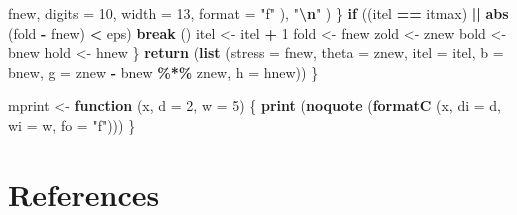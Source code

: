 \documentclass[
  12pt,
]{article}
\newenvironment{Shaded}{\begin{snugshade}}{\end{snugshade}}
\newcommand{\AttributeTok}[1]{\textcolor[rgb]{0.13,0.29,0.53}{#1}}
\newcommand{\ControlFlowTok}[1]{\textcolor[rgb]{0.13,0.29,0.53}{\textbf{#1}}}
\newcommand{\DecValTok}[1]{\textcolor[rgb]{0.00,0.00,0.81}{#1}}
\newcommand{\FunctionTok}[1]{\textcolor[rgb]{0.13,0.29,0.53}{\textbf{#1}}}
\newcommand{\NormalTok}[1]{#1}
\newcommand{\OtherTok}[1]{\textcolor[rgb]{0.56,0.35,0.01}{#1}}
\newcommand{\SpecialCharTok}[1]{\textcolor[rgb]{0.81,0.36,0.00}{\textbf{#1}}}
\newcommand{\StringTok}[1]{\textcolor[rgb]{0.31,0.60,0.02}{#1}}
\begin{document}
\begin{Shaded}
\begin{Highlighting}[]
\NormalTok{          fnew,}
          \AttributeTok{digits =} \DecValTok{10}\NormalTok{,}
          \AttributeTok{width =} \DecValTok{13}\NormalTok{,}
          \AttributeTok{format =} \StringTok{"f"}
\NormalTok{        ),}
        \StringTok{"}\SpecialCharTok{\textbackslash{}n}\StringTok{"}
\NormalTok{      )}
\NormalTok{    \}}
    \ControlFlowTok{if}\NormalTok{ ((itel }\SpecialCharTok{==}\NormalTok{ itmax) }\SpecialCharTok{||} \FunctionTok{abs}\NormalTok{ (fold }\SpecialCharTok{{-}}\NormalTok{ fnew) }\SpecialCharTok{\textless{}}\NormalTok{ eps)}
      \ControlFlowTok{break}\NormalTok{ ()}
\NormalTok{    itel }\OtherTok{\textless{}{-}}\NormalTok{ itel }\SpecialCharTok{+} \DecValTok{1}
\NormalTok{    fold }\OtherTok{\textless{}{-}}\NormalTok{ fnew}
\NormalTok{    zold }\OtherTok{\textless{}{-}}\NormalTok{ znew}
\NormalTok{    bold }\OtherTok{\textless{}{-}}\NormalTok{ bnew}
\NormalTok{    hold }\OtherTok{\textless{}{-}}\NormalTok{ hnew}
\NormalTok{  \}}
  \FunctionTok{return}\NormalTok{ (}\FunctionTok{list}\NormalTok{ (}\AttributeTok{stress =}\NormalTok{ fnew, }\AttributeTok{theta =}\NormalTok{ znew, }\AttributeTok{itel =}\NormalTok{ itel, }\AttributeTok{b =}\NormalTok{ bnew, }\AttributeTok{g =}\NormalTok{ znew }\SpecialCharTok{{-}}\NormalTok{ bnew }\SpecialCharTok{\%*\%}\NormalTok{ znew, }\AttributeTok{h =}\NormalTok{ hnew))}
\NormalTok{\}}

\NormalTok{mprint }\OtherTok{\textless{}{-}} \ControlFlowTok{function}\NormalTok{ (x, }\AttributeTok{d =} \DecValTok{2}\NormalTok{, }\AttributeTok{w =} \DecValTok{5}\NormalTok{) \{}
  \FunctionTok{print}\NormalTok{ (}\FunctionTok{noquote}\NormalTok{ (}\FunctionTok{formatC}\NormalTok{ (x, }\AttributeTok{di =}\NormalTok{ d, }\AttributeTok{wi =}\NormalTok{ w, }\AttributeTok{fo =} \StringTok{"f"}\NormalTok{)))}
\NormalTok{\}}
\end{Highlighting}
\end{Shaded}

\section*{References}\label{references}
\end{document}
